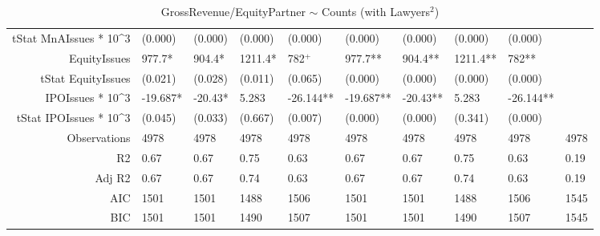 \begin{table}[ht]
\begin{tabular}{rlllllllll}
  tStat MnAIssues * 10^3 & (0.000) & (0.000) & (0.000) & (0.000) & (0.000) & (0.000) & (0.000) & (0.000) &  \\ 
  EquityIssues & 977.7* & 904.4* & 1211.4* & 782$^{+}$ & 977.7** & 904.4** & 1211.4** & 782** &  \\ 
  tStat EquityIssues & (0.021) & (0.028) & (0.011) & (0.065) & (0.000) & (0.000) & (0.000) & (0.000) &  \\ 
  IPOIssues * 10^3 & -19.687* & -20.43* & 5.283 & -26.144** & -19.687** & -20.43** & 5.283 & -26.144** &  \\ 
  tStat IPOIssues * 10^3 & (0.045) & (0.033) & (0.667) & (0.007) & (0.000) & (0.000) & (0.341) & (0.000) &  \\ 
  Observations & 4978 & 4978 & 4978 & 4978 & 4978 & 4978 & 4978 & 4978 & 4978 \\ 
  R2 & 0.67 & 0.67 & 0.75 & 0.63 & 0.67 & 0.67 & 0.75 & 0.63 & 0.19 \\ 
  Adj R2 & 0.67 & 0.67 & 0.74 & 0.63 & 0.67 & 0.67 & 0.74 & 0.63 & 0.19 \\ 
  AIC & 1501 & 1501 & 1488 & 1506 & 1501 & 1501 & 1488 & 1506 & 1545 \\ 
  BIC & 1501 & 1501 & 1490 & 1507 & 1501 & 1501 & 1490 & 1507 & 1545 \\ 
   \hline
\end{tabular}
\caption{GrossRevenue/EquityPartner $\sim$ Counts (with Lawyers$^2$)} 
\end{table}
